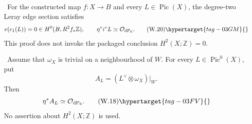 
\begin{proposition}
\hypertarget{tag-03IM}{}\label{wbII:prop:leray-edge-restriction}


\ For the constructed map $f:X\to B$ and every
$L\in\operatorname{Pic}(X)$, the degree-two Leray edge section satisfies
\[
 e(c_1(L))=0\in H^0(B,R^2f_*\mathbb Z),
 \qquad
 \eta^*i^*L\simeq\mathcal O_{\mathrm{dP}_6}.
\tag{W.20}\hypertarget{tag-03GM}{}\label{wbII:eq:W:5.17c}
\]
This proof does not invoke the packaged conclusion
$H^2(X;\mathbb Z)=0$.
\end{proposition}

\begin{proposition}
\hypertarget{tag-03IO}{}\label{wbII:prop:pic0-pullback}


\ Assume that $\omega_X$ is trivial on a neighbourhood of $W$.
For every $L\in\operatorname{Pic}^0(X)$, put
\[
 A_L=(L^\vee\otimes\omega_X)|_W.
\]
Then
\[
 \eta^*A_L\simeq\mathcal O_{\mathrm{dP}_6}.
\tag{W.18}\hypertarget{tag-03FV}{}\label{wbII:eq:W:5.17a}
\]
No assertion about $H^2(X;\mathbb Z)$ is used.
\end{proposition}

